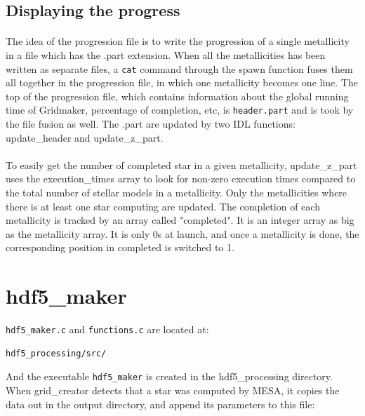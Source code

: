 \documentclass{report}
\begin{document}
\subsection{Displaying the progress}

\paragraph{}The idea of the progression file is to write the progression of a single metallicity in a file which has the .part extension. When all the metallicities
has been written as separate files, a \verb+cat+ command through the spawn function fuses them all together in the progression file, in which one 
metallicity becomes one line. The top of the progression file, which contains information about the global running time of Gridmaker, percentage of
completion, etc, is \verb+header.part+ and is took by the file fusion as well. The .part are updated by two IDL functions: update\_header and update\_z\_part.

\paragraph{}To easily get the number of completed star in a given metallicity, update\_z\_part uses the execution\_times array to look for non-zero execution times compared to the total number of stellar models in a metallicity. Only the metallicities where there is at least one star computing are updated. The completion of each metallicity is tracked by an array called "completed". It is an integer array as big as the metallicity array. It is only 0s at launch, and once a metallicity is done, the corresponding position in completed is switched to 1.



\section{hdf5\_maker}

\verb+hdf5_maker.c+ and \verb+functions.c+ are located at:

\begin{verbatim}
hdf5_processing/src/
\end{verbatim}

And the executable \verb+hdf5_maker+ is created in the hdf5\_processing directory. When grid\_creator detects that a star was computed by MESA, it copies the data out in the output directory, and append its parameters to this file:
\end{document}
